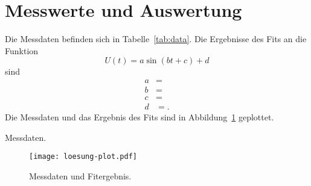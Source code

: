 



\section{Messwerte und Auswertung}

Die Messdaten befinden sich in Tabelle~\ref{tab:data}.
Die Ergebnisse des Fits an die Funktion
\begin{equation}
  U(t) = a \sin(b t + c) + d
\end{equation}
sind
\begin{align}
  a &=  \\
  b &=  \\
  c &=  \\
  d &=  .
\end{align}
Die Messdaten und das Ergebnis des Fits sind in Abbildung~\ref{fig:plot} geplottet.

\begin{table}
  \centering
  \caption{Messdaten.}
  \label{tab:data}
  
\end{table}

\begin{figure}
  \centering
  \texttt{[image: loesung-plot.pdf]}
  \caption{Messdaten und Fitergebnis.}
  \label{fig:plot}
\end{figure}


